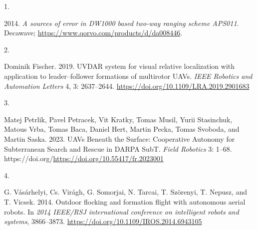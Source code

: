 \documentclass[twoside]{ctustyle/ctuthesis}
\theoremstyle{plain}
\theoremstyle{definition}
\theoremstyle{note}
\newlength{\cslhangindent}
\newlength{\csllabelwidth}
\newlength{\cslentryspacingunit} %
\newenvironment{CSLReferences}[2] %
 {%
  \setlength{\parindent}{0pt}
  \ifodd #1
  \let\oldpar\par
  \def\par{\hangindent=\cslhangindent\oldpar}
  \fi
  \setlength{\parskip}{#2\cslentryspacingunit}
 }%
 {}
\newcommand{\CSLLeftMargin}[1]{\parbox[t]{\csllabelwidth}{#1}}
\newcommand{\CSLRightInline}[1]{\parbox[t]{\linewidth - \csllabelwidth}{#1}\break}
\begin{document}
\hypertarget{refs}{}
\begin{CSLReferences}{0}{0}
\leavevmode{}%
\CSLLeftMargin{1. }%
\CSLRightInline{2014. \emph{A sources of error in DW1000 based two-way
ranging scheme APS011}. Decawave;
\url{https://www.qorvo.com/products/d/da008446}.}

\leavevmode{}%
\CSLLeftMargin{2. }%
\CSLRightInline{Dominik Fischer. 2019. UVDAR system for visual relative
localization with application to leader--follower formations of
multirotor UAVs. \emph{IEEE Robotics and Automation Letters} 4, 3:
2637--2644. \url{https://doi.org/10.1109/LRA.2019.2901683}}

\leavevmode{}%
\CSLLeftMargin{3. }%
\CSLRightInline{Matej Petrlik, Pavel Petracek, Vit Kratky, Tomas Musil,
Yurii Stasinchuk, Matous Vrba, Tomas Baca, Daniel Hert, Martin Pecka,
Tomas Svoboda, and Martin Saska. 2023. {UAVs Beneath the Surface:
Cooperative Autonomy for Subterranean Search and Rescue in DARPA SubT}.
\emph{Field Robotics} 3: 1--68.
https://doi.org/\url{https://doi.org/10.55417/fr.2023001}}

\leavevmode{}%
\CSLLeftMargin{4. }%
\CSLRightInline{G. Vásárhelyi, Cs. Virágh, G. Somorjai, N. Tarcai, T.
Szörenyi, T. Nepusz, and T. Vicsek. 2014. Outdoor flocking and formation
flight with autonomous aerial robots. In \emph{2014 IEEE/RSJ
international conference on intelligent robots and systems}, 3866--3873.
\url{https://doi.org/10.1109/IROS.2014.6943105}}

\end{CSLReferences}





% 
% 
\end{document}

